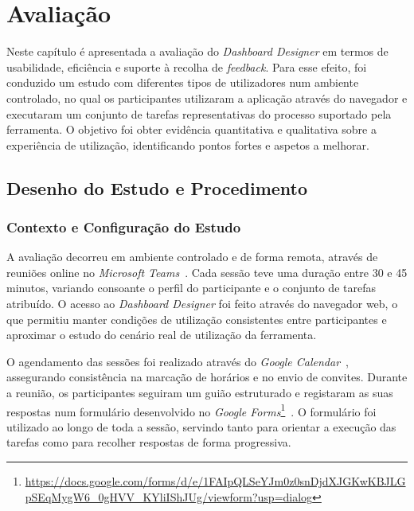 
%

\chapter{Avaliação}
\label{cha:avaliacao}

Neste capítulo é apresentada a avaliação do \textit{Dashboard Designer} em termos de usabilidade, eficiência e suporte à recolha de \textit{feedback}. Para esse efeito, foi conduzido um estudo com diferentes tipos de utilizadores num ambiente controlado, no qual os participantes utilizaram a aplicação através do navegador e executaram um conjunto de tarefas representativas do processo suportado pela ferramenta. O objetivo foi obter evidência quantitativa e qualitativa sobre a experiência de utilização, identificando pontos fortes e aspetos a melhorar.

\section{Desenho do Estudo e Procedimento}
\label{sec:cap5_study_design}

\subsection{Contexto e Configuração do Estudo}
\label{subsec:cap5_context}

A avaliação decorreu em ambiente controlado e de forma remota, através de reuniões online no \textit{Microsoft Teams}~\cite{microsoft_teams_docs}. Cada sessão teve uma duração entre 30 e 45 minutos, variando consoante o perfil do participante e o conjunto de tarefas atribuído. O acesso ao \textit{Dashboard Designer} foi feito através do navegador web, o que permitiu manter condições de utilização consistentes entre participantes e aproximar o estudo do cenário real de utilização da ferramenta.

O agendamento das sessões foi realizado através do \textit{Google Calendar}~\cite{google_calendar_help}, assegurando consistência na marcação de horários e no envio de convites. Durante a reunião, os participantes seguiram um guião estruturado e registaram as suas respostas num formulário desenvolvido no \textit{Google Forms}\footnote{\url{https://docs.google.com/forms/d/e/1FAIpQLSeYJm0z0snDjdXJGKwKBJLGpSEqMygW6_0gHVV_KYliIShJUg/viewform?usp=dialog}}~\cite{google_forms_help}. O formulário foi utilizado ao longo de toda a sessão, servindo tanto para orientar a execução das tarefas como para recolher respostas de forma progressiva.

